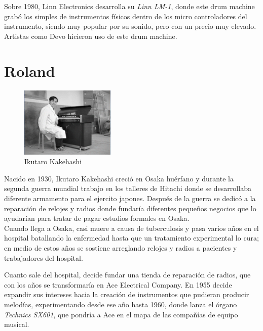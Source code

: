 \documentclass{article}
\begin{document}
Sobre 1980, Linn Electronics desarrolla su \emph{Linn LM-1}, donde este drum machine grabó los simples de instrumentos físicos dentro de los micro controladores del instrumento, siendo muy popular por su sonido, pero con un precio muy elevado. Artistas como Devo hicieron uso de este drum machine.\cite{14drums}

\endgroup

\section{Roland}

\begingroup
\setlength{\intextsep}{0pt}%
\setlength{\columnsep}{0pt}%

\begin{figure}
    \centering
    \includegraphics[width=0.4\textwidth]{images/ik.jpg}
    \vspace{-5pt}
    \caption{Ikutaro Kakehashi}
\end{figure}

Nacido en 1930, Ikutaro Kakehashi creció en Osaka huérfano y durante la segunda guerra mundial trabajo en los talleres de Hitachi donde se desarrollaba diferente armamento para el ejercito japones. Después de la guerra se dedicó a la reparación de relojes y radios donde fundaría diferentes pequeños negocios que lo ayudarían para tratar de pagar estudios formales en Osaka.\cite{rolandstory}\\

Cuando llega a Osaka, casi muere a causa de tuberculosis y pasa varios años en el hospital batallando la enfermedad hasta que un tratamiento experimental lo cura; en medio de estos años se sostiene arreglando relojes y radios a pacientes y trabajadores del hospital.\cite{rolandstory}\\

\endgroup

Cuanto sale del hospital, decide fundar una tienda de reparación de radios, que con los años se transformaría en Ace Electrical Company. En 1955 decide expandir sus intereses hacia la creación de instrumentos que pudieran producir melodías, experimentando desde ese año hasta 1960, donde lanza el órgano \emph{Technics SX601}, que pondría a Ace en el mapa de las compañías de equipo musical.\cite{rolandstory}\\
\end{document}
